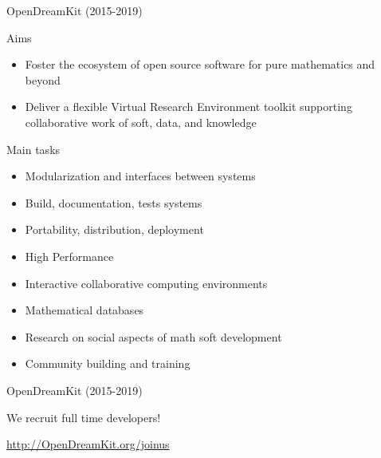 \documentclass[
  usenames,svgnames, %
  compress,
  ]{beamer}
\begin{document}
\begin{frame}{OpenDreamKit (2015-2019)}
  \begin{block}{Aims}
    \begin{itemize}
    \item Foster the ecosystem of open source software for pure
      mathematics and beyond
    \item Deliver a flexible Virtual Research Environment toolkit
      supporting collaborative work of soft, data, and knowledge
    \end{itemize}
  \end{block}

  \begin{block}{Main tasks}
    \begin{itemize}
    \item Modularization and interfaces between systems
    \item Build, documentation, tests systems
    \item Portability, distribution, deployment
    \item High Performance
    \item Interactive collaborative computing environments
    \item Mathematical databases
    \item Research on social aspects of math soft development
    \item Community building and training
    \end{itemize}
  \end{block}
\end{frame}

\begin{frame}{OpenDreamKit (2015-2019)}
  \begin{block}{\Large \color{red} We recruit full time developers!}
    \centerline{\LARGE \url{http://OpenDreamKit.org/joinus}}
  \end{block}
\end{frame}
\end{document}
